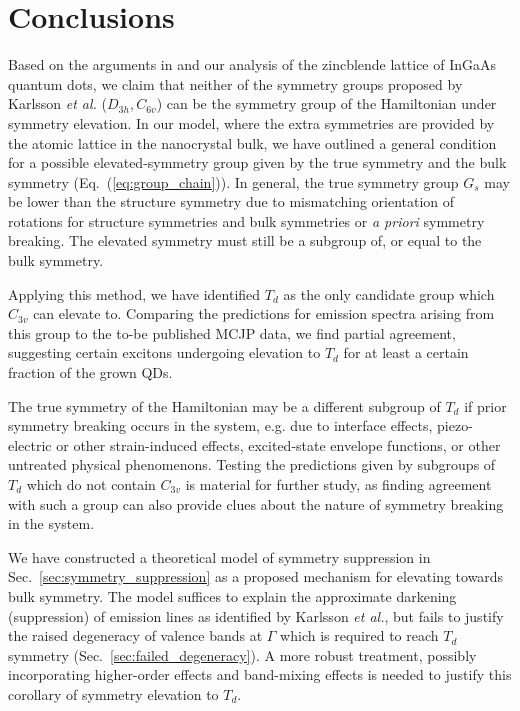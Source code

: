 \section{Conclusions} \label{sec:conclusions}

Based on the arguments in \cite{bulk_limiting} and our analysis of the zincblende lattice of InGaAs quantum dots, we claim that neither of the symmetry groups proposed by Karlsson \textit{et al.} ($D_{3h}, C_{6v}$) can be the symmetry group of the Hamiltonian under symmetry elevation. In our model, where the extra symmetries are provided by the atomic lattice in the nanocrystal bulk, we have outlined a general condition for a possible elevated-symmetry group given by the true symmetry and the bulk symmetry (Eq.~(\ref{eq:group_chain})). In general, the true symmetry group $G_s$ may be lower than the structure symmetry due to mismatching orientation of rotations for structure symmetries and bulk symmetries or \textit{a priori} symmetry breaking. The elevated symmetry must still be a subgroup of, or equal to the bulk symmetry.

Applying this method, we have identified $T_d$ as the only candidate group which $C_{3v}$ can elevate to. Comparing the predictions for emission spectra arising from this group to the to-be published MCJP data, we find partial agreement, suggesting certain excitons undergoing elevation to $T_d$ for at least a certain fraction of the grown QDs.

The true symmetry of the Hamiltonian may be a different subgroup of $T_d$ if prior symmetry breaking occurs in the system, e.g. due to interface effects, piezo-electric or other strain-induced effects, excited-state envelope functions, or other untreated physical phenomenons. Testing the predictions given by subgroups of $T_d$ which do not contain $C_{3v}$ is material for further study, as finding agreement with such a group can also provide clues about the nature of symmetry breaking in the system.

We have constructed a theoretical model of symmetry suppression in Sec.~\ref{sec:symmetry_suppression} as a proposed mechanism for elevating towards bulk symmetry. The model suffices to explain the approximate darkening (suppression) of emission lines as identified by Karlsson \textit{et al.}, but fails to justify the raised degeneracy of valence bands at $\Gamma$ which is required to reach $T_d$ symmetry (Sec.~\ref{sec:failed_degeneracy}). A more robust treatment, possibly incorporating higher-order effects and band-mixing effects is needed to justify this corollary of symmetry elevation to $T_d$.

